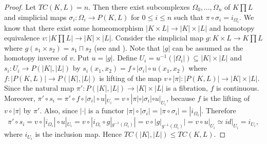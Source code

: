 \documentclass[preprint,11pt %
]{hjm1}
\theoremstyle{definition}
\begin{document}
\begin{proof}
Let $TC(K,L)=n$. Then there exist subcomplexes $\Omega_0,...,\Omega_n$ of $K \prod L$ and simplicial maps $\sigma_i:\Omega_i\to P(K,L)$ for $0\leq i\leq n$ such that $\pi \circ \sigma_i=i_{\Omega_i}$.
We know that 
there exist some homeomorphism $|K\times L| \to |K|\times |L|$ and  homotopy equivalence 
$v: |K \prod L| \to |K| \times |L|$. Consider the simplicial map $g:K\times L\to K \prod L$ where $g(s_1\times s_2)=s_1\sqcap s_2$ (see \cite{com} and \cite{Hat}).  Note that $|g|$ can be assumed as the homotopy inverse of $v$.
Put $u=|g|$. Define $U_i=u^{-1}(|\Omega_i|) \subseteq |K|\times|L|$ and $s_i:U_i\to P(|K|,|L|)$ by $s_i(x_1,x_2)=f\circ |\sigma_i|\circ u(x_1,x_2)$  where 
$f:|P(K,L)| \to P(| K|,| L|)$ is  lifting of the map $ v \circ |\pi| : |P(K,L)| \to |K|\times |L|$. Since the natural map $\pi': P(|K|,|L|) \to |K| \times |L|$ is a fibration, $f$ is continuous. 
Moreover, $\pi' \circ s_i = \pi' \circ f\circ |\sigma_i|\circ u|_{U_i} = v \circ |\pi| \circ |\sigma_i|\circ u|_{U_i}$, because $f$ is the lifting of $ v \circ |\pi|$ by $\pi'$. Also, since $|\cdot|$ is a functor $|\pi| \circ |\sigma_i| = |\pi \circ \sigma_i| = | i_{\Omega_i}|$. 
Therefore
\[
\pi' \circ s_i= v \circ |i_{\Omega_i}| \circ u|_{U_i}  = v \circ |i_{\Omega_i} \circ g|_{g^{-1} (\Omega_i)}|  = v \circ |g|_{g^{-1} (\Omega_i)}| = v \circ u|_{U_i} \simeq id|_{U_i} = i_{U_i},
\]
where $i_{U_i}$ is the inclusion map. Hence 
$TC(|K|,|L|)\leq TC(K,L)$.
\end{proof}
\end{document}
